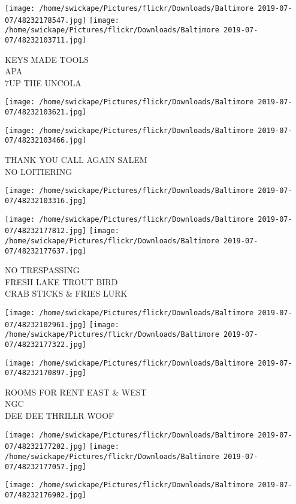 \documentclass[10pt,letterpaper]{article}
\begin{document}
\vspace{0.25in}
\texttt{[image: /home/swickape/Pictures/flickr/Downloads/Baltimore 2019-07-07/48232178547.jpg]}
\texttt{[image: /home/swickape/Pictures/flickr/Downloads/Baltimore 2019-07-07/48232103711.jpg]}

KEYS MADE TOOLS\\
APA\\
7UP THE UNCOLA
\pagebreak

\texttt{[image: /home/swickape/Pictures/flickr/Downloads/Baltimore 2019-07-07/48232103621.jpg]}

\vspace{0.25in}
\texttt{[image: /home/swickape/Pictures/flickr/Downloads/Baltimore 2019-07-07/48232103466.jpg]}

THANK YOU CALL AGAIN SALEM\\
NO LOITIERING
\pagebreak

\texttt{[image: /home/swickape/Pictures/flickr/Downloads/Baltimore 2019-07-07/48232103316.jpg]}

\vspace{0.25in}
\texttt{[image: /home/swickape/Pictures/flickr/Downloads/Baltimore 2019-07-07/48232177812.jpg]}
\texttt{[image: /home/swickape/Pictures/flickr/Downloads/Baltimore 2019-07-07/48232177637.jpg]}

NO TRESPASSING\\
FRESH LAKE TROUT BIRD\\
CRAB STICKS \& FRIES LURK
\pagebreak

\texttt{[image: /home/swickape/Pictures/flickr/Downloads/Baltimore 2019-07-07/48232102961.jpg]}
\texttt{[image: /home/swickape/Pictures/flickr/Downloads/Baltimore 2019-07-07/48232177322.jpg]}

\vspace{0.25in}
\texttt{[image: /home/swickape/Pictures/flickr/Downloads/Baltimore 2019-07-07/48232170897.jpg]}

ROOMS FOR RENT EAST \& WEST\\
NGC\\
DEE DEE THRILLR WOOF
\pagebreak

\texttt{[image: /home/swickape/Pictures/flickr/Downloads/Baltimore 2019-07-07/48232177202.jpg]}
\texttt{[image: /home/swickape/Pictures/flickr/Downloads/Baltimore 2019-07-07/48232177057.jpg]}

\texttt{[image: /home/swickape/Pictures/flickr/Downloads/Baltimore 2019-07-07/48232176902.jpg]}
\end{document}
